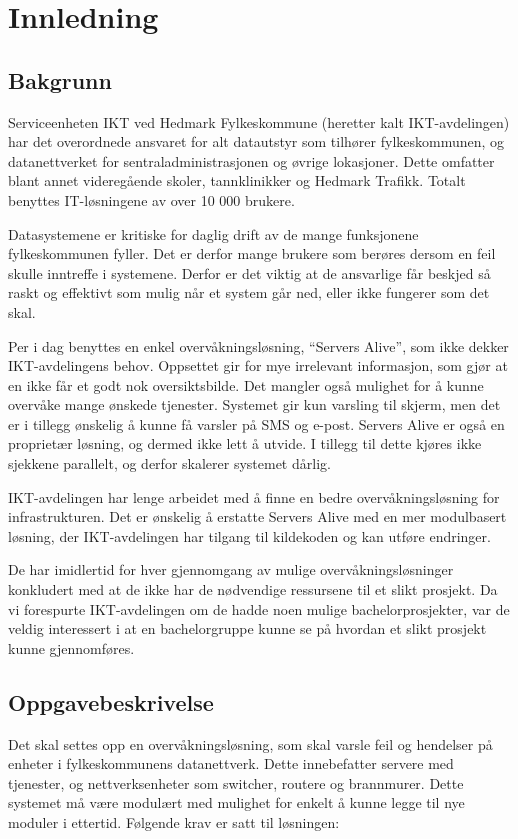 \chapter{Innledning}
\section{Bakgrunn}
Serviceenheten IKT ved Hedmark Fylkeskommune (heretter kalt IKT-avdelingen) har det overordnede ansvaret for alt datautstyr som tilhører fylkeskommunen, og datanettverket for sentraladministrasjonen og øvrige lokasjoner. Dette omfatter blant annet videregående skoler, tannklinikker og Hedmark Trafikk. Totalt benyttes IT-løsningene av over 10 000 brukere.

Datasystemene er kritiske for daglig drift av de mange funksjonene fylkeskommunen fyller. Det er derfor mange brukere som berøres dersom en feil skulle inntreffe i systemene. Derfor er det viktig at de ansvarlige får beskjed så raskt og effektivt som mulig når et system går ned, eller ikke fungerer som det skal.

Per i dag benyttes en enkel overvåkningsløsning, ``Servers Alive''\cite{servers}, som ikke dekker IKT-avdelingens behov. Oppsettet gir for mye irrelevant informasjon, som gjør at en ikke får et godt nok oversiktsbilde. Det mangler også mulighet for å kunne overvåke mange ønskede tjenester. Systemet gir kun varsling til skjerm, men det er i tillegg ønskelig å kunne få varsler på SMS og e-post. Servers Alive er også en proprietær løsning, og dermed ikke lett å utvide. I tillegg til dette kjøres ikke sjekkene parallelt, og derfor skalerer systemet dårlig.

IKT-avdelingen har lenge arbeidet med å finne en bedre overvåkningsløsning for infrastrukturen. Det er ønskelig å erstatte Servers Alive med en mer modulbasert løsning, der IKT-avdelingen har tilgang til kildekoden og kan utføre endringer.

De har imidlertid for hver gjennomgang av mulige overvåkningsløsninger konkludert med at de ikke har de nødvendige ressursene til et slikt prosjekt. Da vi forespurte IKT-avdelingen om de hadde noen mulige bachelorprosjekter, var de veldig interessert i at en bachelorgruppe kunne se på hvordan et slikt prosjekt kunne gjennomføres.

\section*{Oppgavebeskrivelse}
Det skal settes opp en overvåkningsløsning, som skal varsle feil og hendelser på enheter i fylkeskommunens datanettverk. Dette innebefatter servere med tjenester, og nettverksenheter som switcher, routere og brannmurer. Dette systemet må være modulært med mulighet for enkelt å kunne legge til nye moduler i ettertid. Følgende krav er satt til løsningen:

